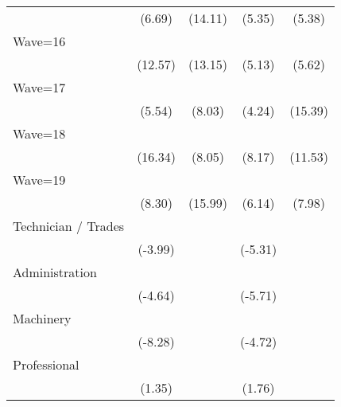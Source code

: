 {\begin{tabular}{l*{4}{c}}
                    &      (6.69)         &     (14.11)         &      (5.35)         &      (5.38)         \\
[1em]
Wave=16             &            \sym{***}&            \sym{***}&            \sym{***}&            \sym{***}\\
                    &     (12.57)         &     (13.15)         &      (5.13)         &      (5.62)         \\
[1em]
Wave=17             &            \sym{***}&            \sym{***}&            \sym{***}&            \sym{***}\\
                    &      (5.54)         &      (8.03)         &      (4.24)         &     (15.39)         \\
[1em]
Wave=18             &            \sym{***}&            \sym{***}&            \sym{***}&            \sym{***}\\
                    &     (16.34)         &      (8.05)         &      (8.17)         &     (11.53)         \\
[1em]
Wave=19             &            \sym{***}&            \sym{***}&            \sym{***}&            \sym{***}\\
                    &      (8.30)         &     (15.99)         &      (6.14)         &      (7.98)         \\
[1em]
Technician / Trades &            \sym{***}&                     &            \sym{***}&                     \\
                    &     (-3.99)         &                     &     (-5.31)         &                     \\
[1em]
Administration      &            \sym{***}&                     &            \sym{***}&                     \\
                    &     (-4.64)         &                     &     (-5.71)         &                     \\
[1em]
Machinery           &            \sym{***}&                     &            \sym{***}&                     \\
                    &     (-8.28)         &                     &     (-4.72)         &                     \\
[1em]
Professional        &                     &                     &                     &                     \\
                    &      (1.35)         &                     &      (1.76)         &                     \\

\end{tabular}}

